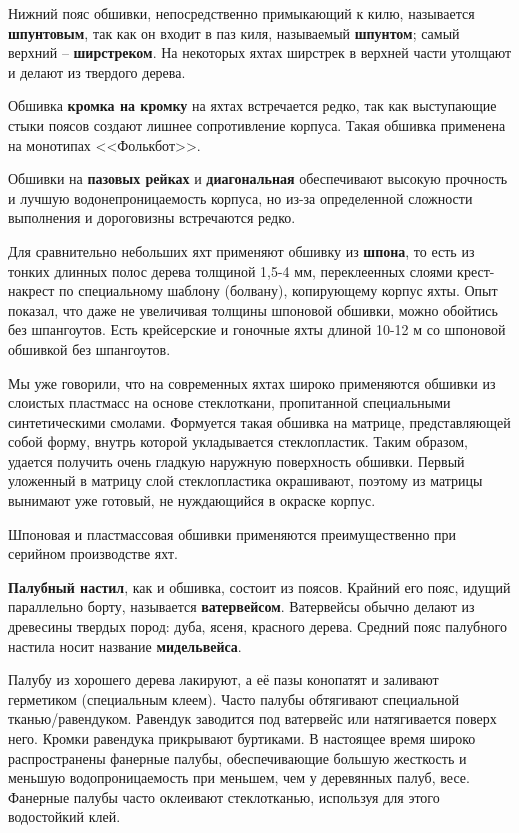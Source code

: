 \documentclass[a4paper, 12pt, twoside, final]{scrbook}
\begin{document}
Нижний пояс обшивки, непосредственно примыкающий к килю, называется
\textbf{шпунтовым}, так как он входит в паз киля, называемый \textbf{шпунтом};
самый верхний \--- \textbf{ширстреком}. На некоторых яхтах ширстрек в
верхней части утолщают и делают из твердого дерева.

Обшивка \textbf{кромка на кромку} на яхтах встречается редко, так
как выступающие стыки поясов создают лишнее сопротивление корпуса.
Такая обшивка применена на монотипах <<Фолькбот>>.

Обшивки на \textbf{пазовых рейках} и \textbf{диагональная} обеспечивают
высокую прочность и лучшую водонепроницаемость корпуса, но из-за определенной
сложности выполнения и дороговизны встречаются редко.

Для сравнительно небольших яхт применяют обшивку из \textbf{шпона},
то есть из тонких длинных полос дерева толщиной 1,5-4 мм, переклеенных
слоями крест-накрест по специальному шаблону (болвану), копирующему
корпус яхты. Опыт показал, что даже не увеличивая толщины шпоновой
обшивки, можно обойтись без шпангоутов. Есть крейсерские и гоночные
яхты длиной 10-12 м со шпоновой обшивкой без шпангоутов.

Мы уже говорили, что на современных яхтах широко применяются обшивки
из слоистых пластмасс на основе стеклоткани, пропитанной специальными
синтетическими смолами. Формуется такая обшивка на матрице, представляющей
собой форму, внутрь которой укладывается стеклопластик. Таким образом,
удается получить очень гладкую наружную поверхность обшивки. Первый
уложенный в матрицу слой стеклопластика окрашивают, поэтому из матрицы
вынимают уже готовый, не нуждающийся в окраске корпус.

Шпоновая и пластмассовая обшивки применяются преимущественно при серийном
производстве яхт.

\textbf{Палубный настил}, как и обшивка, состоит из поясов. Крайний
его пояс, идущий параллельно борту, называется \textbf{ватервейсом}.
Ватервейсы обычно делают из древесины твердых пород: дуба, ясеня,
красного дерева. Средний пояс палубного настила носит название \textbf{мидельвейса}.

Палубу из хорошего дерева лакируют, а её пазы конопатят и заливают
герметиком (специальным клеем). Часто палубы обтягивают специальной
тканью\-/равендуком. Равендук заводится под ватервейс или натягивается
поверх него. Кромки равендука прикрывают буртиками. В настоящее время
широко распространены фанерные палубы, обеспечивающие большую жесткость
и меньшую водопроницаемость при меньшем, чем у деревянных палуб, весе.
Фанерные палубы часто оклеивают стеклотканью, используя для этого
водостойкий клей.
\end{document}

